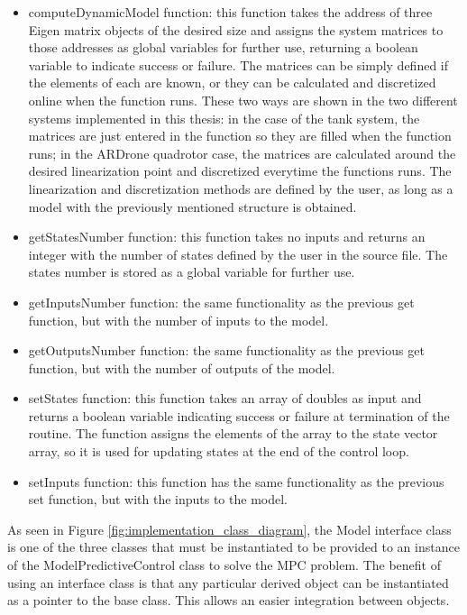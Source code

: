 \begin{itemize}

\item computeDynamicModel function: this function takes the address of three Eigen matrix objects of the desired size and assigns the system matrices to those addresses as global variables for further use, returning a boolean variable to indicate success or failure. The matrices can be simply defined if the elements of each are known, or they can be calculated and discretized online when the function runs. These two ways are shown in the two different systems implemented in this thesis: in the case of the tank system, the matrices are just entered in the function so they are filled when the function runs; in the ARDrone quadrotor case, the matrices are calculated around the desired linearization point and discretized everytime the functions runs. The linearization and discretization methods are defined by the user, as long as a model with the previously mentioned structure is obtained.

\item getStatesNumber function: this function takes no inputs and returns an integer with the number of states defined by the user in the source file. The states number is stored as a global variable for further use.

\item getInputsNumber function: the same functionality as the previous get function, but with the number of inputs to the model.

\item getOutputsNumber function: the same functionality as the previous get function, but with the number of outputs of the model.

\item setStates function: this function takes an array of doubles as input and returns a boolean variable indicating success or failure at termination of the routine. The function assigns the elements of the array to the state vector array, so it is used for updating states at the end of the control loop.

\item setInputs function: this function has the same functionality as the previous set function, but with the inputs to the model.

\end{itemize}

As seen in Figure \ref{fig:implementation_class_diagram}, the Model interface class is one of the three classes that must be instantiated to be provided to an instance of the ModelPredictiveControl class to solve the MPC problem. The benefit of using an interface class is that any particular derived object can be instantiated as a pointer to the base class. This allows an easier integration between objects.

